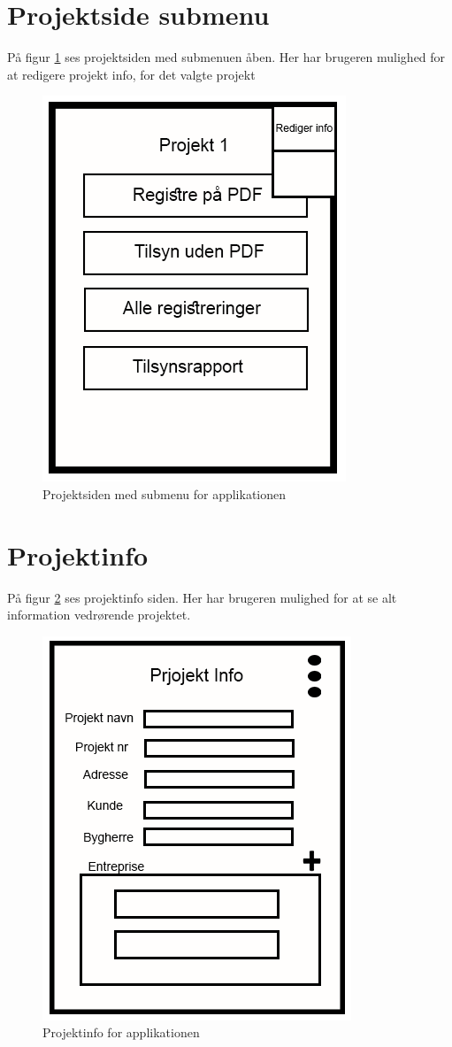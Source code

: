 \section{Projektside submenu}\label{sec:ProjektsideSubMock}
På figur \ref{fig:ProjektsideSubMock} ses projektsiden med submenuen åben. Her har brugeren mulighed for at redigere projekt info, for det valgte projekt

\begin{figure}[H]
	\centering
	\includegraphics[width=0.4\linewidth]{MockUps/Mock/Ramboell-Registrer-sub}
	\caption{Projektsiden med submenu for applikationen}
	\label{fig:ProjektsideSubMock}
\end{figure}

\section{Projektinfo}\label{sec:ProjektinfoMock}
På figur \ref{fig:ProjektinfoMock} ses projektinfo siden. Her har brugeren mulighed for at se alt information vedrørende projektet.

\begin{figure}[H]
	\centering
	\includegraphics[width=0.4\linewidth]{MockUps/Mock/Ramboell-ProjektInfo}
	\caption{Projektinfo for applikationen}
	\label{fig:ProjektinfoMock}
\end{figure}

